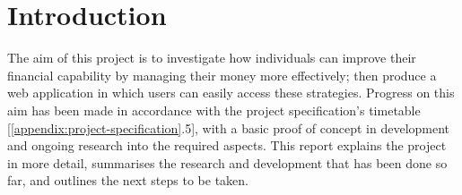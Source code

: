 \section{Introduction}

The aim of this project is to investigate how individuals can improve their financial capability by managing their money more effectively; then produce a web application in which users can easily access these strategies. Progress on this aim has been made in accordance with the project specification's timetable [\ref{appendix:project-specification}.5], with a basic proof of concept in development and ongoing research into the required aspects. This report explains the project in more detail, summarises the research and development that has been done so far, and outlines the next steps to be taken.